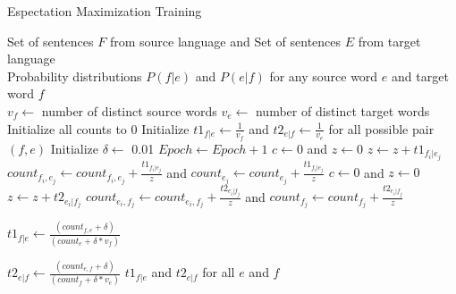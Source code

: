 \documentclass[11pt]{article}
\begin{document}
\begin{algorithm}[htb]
	\renewcommand{\algorithmicrequire}{\textbf{Input:}\hspace{10.7pt}}
	\renewcommand\algorithmicensure {\textbf{Output:} }
	\caption{Espectation Maximization Training}
	\label{alg:pbg}
		\begin{algorithmic}[1]
		\vspace{3pt}
		\REQUIRE
		Set of sentences $F$ from source language and
		Set of sentences $E$ from target language\\
		\ENSURE 
		Probability distributions $P(f|e)$ and $P(e|f)$ 
		for any source word $e$ and target word $f$\\
		\STATE $v_f \gets$ number of distinct source words
		\STATE $v_e \gets$ number of distinct target words
		\STATE Initialize all counts to 0
		\STATE Initialize $t1_{f|e}\gets \frac{1}{v_f}$ and $t2_{e|f}\gets \frac{1}{v_e}$
		for all possible pair $(f,e)$
		\STATE Initialize $\delta \gets$ 0.01  
		  \STATE $Epoch \gets Epoch+1$
			  \STATE $c \gets 0$ and $z \gets 0$
			    \STATE  $z \gets z + t1_{f_i|e_j}$ 
			  \ENDFOR
			    \STATE $count_{f_i,e_j} \gets count_{f_i,e_j}+\frac{t1_{f_i|e_j}}{z}$ and $count_{e_j} \gets count_{e_j}+\frac{t1_{f_i|e_j}}{z}$ 
			  \ENDFOR
			\ENDFOR
			  \STATE $c \gets 0$ and $z \gets 0$
			     \STATE  $z \gets z + t2_{e_i|f_j}$
			  \ENDFOR
			    \STATE $count_{e_i,f_j} \gets count_{e_i,f_j}+\frac{t2_{e_i|f_j}}{z}$ and $count_{f_j} \gets count_{f_j}+\frac{t2_{e_i|f_j}}{z}$
			  \ENDFOR
			\ENDFOR
		  \ENDFOR
		  
		    \STATE $t1_{f|e} \gets \frac{(count_{f,e} + \delta)}{(count_{e} + \delta * v_f)}$
		  \ENDFOR
		  
		    \STATE $t2_{e|f} \gets \frac{(count_{e,f} + \delta)}{(count_{f} + \delta * v_e)}$
		  \ENDFOR
		\ENDWHILE 
	  \RETURN $t1_{f|e}$ and $t2_{e|f}$ for all $e$ and $f$
	\end{algorithmic}
\end{algorithm}
\end{document}
